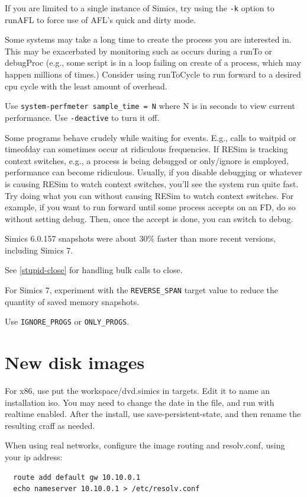 \documentclass[titlepage]{article}
\begin{document}
\begin{appendices}
If you are limited to a single instance of Simics, try using the {\tt -k} option to runAFL to force use of AFL's quick and dirty mode.

Some systems may take a long time to create the process you are interested in.  This may be exacerbated by monitoring such as occurs during
a runTo or debugProc (e.g., some script is in a loop failing on create of a process, which may happen millions of times.)  Consider using
runToCycle to run forward to a desired cpu cycle with the least amount of overhead.

Use {\tt system-perfmeter sample\_time = N} where N is in seconds to view current performance.  Use {\tt -deactive} to turn it off.

Some programs behave crudely while waiting for events.  E.g., calls to waitpid or timeofday can sometimes occur at ridiculous frequencies.
If RESim is tracking context switches, e.g., a process is being debugged or only/ignore is employed, performance can become ridiculous.
Usually, if you disable debugging or whatever is causing RESim to watch context switches, you'll see the system run quite fast.
Try doing what you can without causing RESim to watch context switches.  For example, if you want to run forward until some process accepts
on an FD, do so without setting debug.  Then, once the accept is done, you can switch to debug.

Simics 6.0.157 snapshots were about 30\% faster than more recent versions, including Simics 7.

See \ref{stupid-close} for handling bulk calls to close.

For Simics 7, experiment with the {\tt REVERSE\_SPAN} target value to reduce the quantity of saved memory snapshots.

Use {\tt IGNORE\_PROGS} or {\tt ONLY\_PROGS}.

\section{New disk images}
For x86, use put the workspace/dvd.simics in targets.  Edit it to name an installation iso.  You may need to change the date in
the file, and run with realtime enabled.  After the install, use save-persistent-state, and then rename the resulting craff as
needed.

When using real networks, configure the image routing and resolv.conf, using your ip address:
\begin{verbatim}
  route add default gw 10.10.0.1
  echo nameserver 10.10.0.1 > /etc/resolv.conf
\end{verbatim}



\end{appendices}
\end{document}
